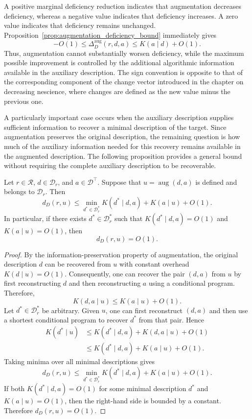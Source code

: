 A positive marginal deficiency reduction indicates that augmentation decreases deficiency, whereas a negative value indicates that deficiency increases. A zero value indicates that deficiency remains unchanged. Proposition~\ref{prop:augmentation_deficiency_bound} immediately gives
\[
-O(1) \le \Delta_D^{\mathrm{aug}}(r,d,a) \le K(a\mid d)+O(1).
\]
Thus, augmentation cannot substantially worsen deficiency, while the maximum possible improvement is controlled by the additional algorithmic information available in the auxiliary description. The sign convention is opposite to that of the corresponding component of the change vector introduced in the chapter on decreasing nescience, where changes are defined as the new value minus the previous one.

A particularly important case occurs when the auxiliary description supplies sufficient information to recover a
minimal description of the target. Since augmentation preserves the original description, the remaining question is how much of the auxiliary information needed for this recovery remains available in the augmented
description. The following proposition provides a general bound without requiring the complete auxiliary description to be recoverable.

\begin{proposition}
\label{prop:augmentation_to_constant_deficiency}
Let $r\in\mathcal R$, $d\in\mathcal D_r$, and $a\in\mathcal D^\top$. Suppose that $u=\operatorname{aug}(d,a)$ is defined and belongs to $\mathcal D_r$. Then
\[
d_D(r,u) \le \min_{d^\ast\in\mathcal D_r^\ast} K(d^\ast\mid d,a) + K(a\mid u)+O(1).
\]
In particular, if there exists $d^\ast\in\mathcal D_r^\ast$ such that $K(d^\ast\mid d,a)=O(1)$ and $K(a\mid u)=O(1)$, then
\[
d_D(r,u)=O(1).
\]
\end{proposition}
\begin{proof}
By the information-preservation property of augmentation, the original description $d$ can be recovered from $u$
with constant overhead $K(d\mid u)=O(1)$. Consequently, one can recover the pair $(d,a)$ from $u$ by first reconstructing $d$ and then reconstructing $a$ using a conditional program. Therefore,
\[
K(d,a\mid u)\le K(a\mid u)+O(1).
\]
Let $d^\ast\in\mathcal D_r^\ast$ be arbitrary. Given $u$, one can first reconstruct $(d,a)$ and then use a shortest conditional program to recover $d^\ast$ from that pair. Hence
\[
\begin{aligned}
K(d^\ast\mid u)
& \le K(d^\ast\mid d,a)+K(d,a\mid u)+O(1)\\
& \le K(d^\ast\mid d,a)+K(a\mid u)+O(1).
\end{aligned}
\]
Taking minima over all minimal descriptions gives
\[
d_D(r,u) \le \min_{d^\ast\in\mathcal D_r^\ast} K(d^\ast\mid d,a) + K(a\mid u)+O(1).
\]
If both $K(d^\ast\mid d,a)=O(1)$ for some minimal description $d^\ast$ and $K(a\mid u)=O(1)$, then the right-hand side is bounded by a constant. Therefore $d_D(r,u)=O(1)$.
\end{proof}

